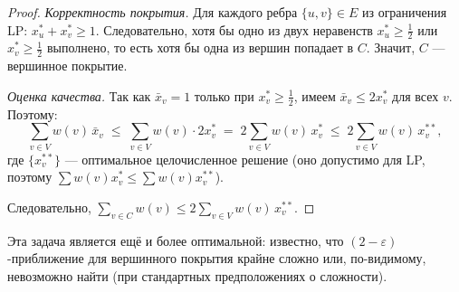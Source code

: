 \begin{proof}
	\emph{Корректность покрытия.} Для каждого ребра $\{u,v\} \in E$ из ограничения LP: $x^*_u + x^*_v \geq 1$. Следовательно, хотя бы одно из двух неравенств $x^*_u \geq \tfrac{1}{2}$ или $x^*_v \geq \tfrac{1}{2}$ выполнено, то есть хотя бы одна из вершин попадает в $C$. Значит, $C$ --- вершинное покрытие.
	
	\emph{Оценка качества.} Так как $\bar{x}_v = 1$ только при $x^*_v \geq \tfrac{1}{2}$, имеем $\bar{x}_v \leq 2 x^*_v$ для всех $v$. Поэтому:
	\[
	\sum_{v \in V} w(v)\,\bar{x}_v \;\leq\; \sum_{v \in V} w(v) \cdot 2 x^*_v \;=\; 2\sum_{v \in V} w(v)\, x^*_v \;\leq\; 2\sum_{v \in V} w(v)\, x^{**}_v,
	\]
	где $\{x^{**}_v\}$ --- оптимальное целочисленное решение (оно допустимо для LP, поэтому $\sum w(v) x^*_v \leq \sum w(v) x^{**}_v$).
	
	Следовательно, $\sum_{v \in C} w(v) \leq 2\sum_{v \in V} w(v)\,x^{**}_v$.
\end{proof}

\begin{Remark}{}{}
	Эта задача является ещё и более оптимальной: известно, что $(2-\varepsilon)$-приближение для вершинного покрытия крайне сложно или, по-видимому, невозможно найти (при стандартных предположениях о сложности).
\end{Remark}